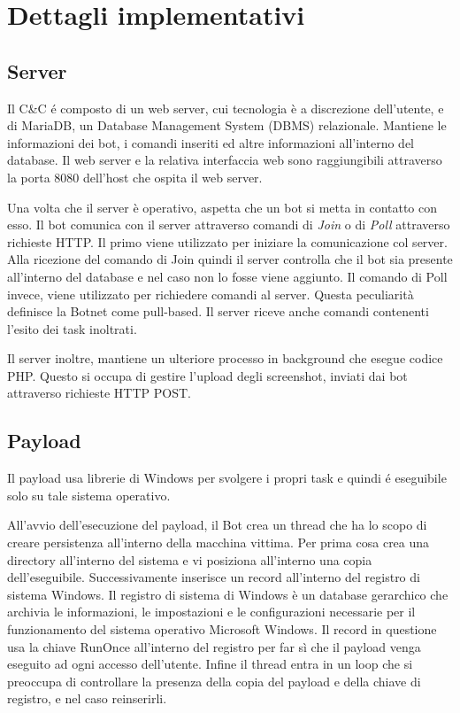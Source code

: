 \section{Dettagli implementativi}

\subsection{Server}
Il C\&C é composto di un web server, cui tecnologia è   a discrezione dell'utente, e di MariaDB, un Database Management System (DBMS) relazionale.
Mantiene le informazioni dei bot, i comandi inseriti ed altre informazioni all'interno del database. Il web server e la relativa interfaccia web sono  raggiungibili attraverso la porta 8080 dell'host che ospita il web server.

Una volta che il server è operativo, aspetta che un bot si metta in contatto con esso.
Il bot comunica con il server attraverso comandi di \textit{Join} o di \textit{Poll} attraverso richieste HTTP. Il primo viene utilizzato per iniziare la comunicazione col server. Alla ricezione del comando di Join quindi il server controlla che il bot sia presente all'interno del database e nel caso non lo fosse viene aggiunto. Il comando di Poll invece, viene utilizzato per richiedere comandi al server. Questa peculiarità  definisce la Botnet come pull-based.
Il server riceve anche comandi contenenti l'esito dei task inoltrati.


Il server inoltre,  mantiene un ulteriore processo in background che esegue codice PHP. Questo   si occupa di gestire l'upload degli screenshot, inviati dai bot attraverso richieste HTTP POST.
\subsection{Payload}
Il payload usa librerie di Windows per svolgere i propri task e quindi é eseguibile solo su tale sistema operativo.

All'avvio dell'esecuzione del payload, il Bot crea un thread che ha lo scopo di creare persistenza all'interno della macchina vittima.  Per prima cosa crea una directory all'interno del sistema e vi posiziona all'interno una copia dell'eseguibile. Successivamente inserisce un record all'interno del registro di sistema Windows.
Il registro di sistema di Windows è un database gerarchico che archivia le informazioni, le impostazioni e le configurazioni necessarie per il funzionamento  del sistema operativo Microsoft Windows.
Il record in questione usa la chiave RunOnce all'interno del registro per far sì che il payload venga eseguito ad ogni accesso dell'utente. Infine il thread entra in un loop che si preoccupa di controllare la presenza della copia del payload e della chiave di registro, e nel caso reinserirli.

